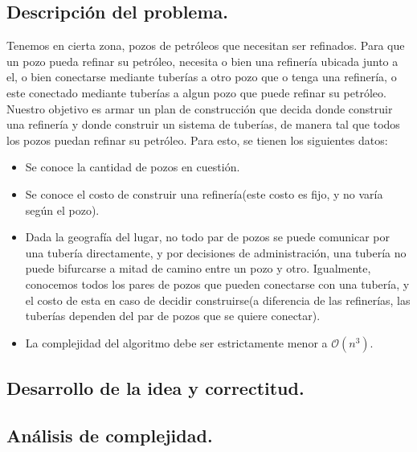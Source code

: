 \subsection{Descripción del problema.}

\vspace*{0.3cm}

Tenemos en cierta zona, pozos de petróleos que necesitan ser refinados. Para que un pozo pueda refinar su petróleo, necesita o bien una refinería ubicada junto a el, o bien conectarse mediante tuberías a otro pozo que o tenga una refinería, o este conectado mediante tuberías a algun pozo que puede refinar su petróleo. Nuestro objetivo es armar un plan de construcción que decida donde construir una refinería y donde construir un sistema de tuberías, de manera tal que todos los pozos puedan refinar su petróleo. Para esto, se tienen los siguientes datos:

\begin{itemize}

	\item Se conoce la cantidad de pozos en cuestión.
	\item Se conoce el costo de construir una refinería(este costo es fijo, y no varía según el pozo).
	\item Dada la geografía del lugar, no todo par de pozos se puede comunicar por una tubería directamente, y por decisiones de administración, una tubería no puede bifurcarse a mitad de camino entre un pozo y otro. Igualmente, conocemos todos los pares de pozos que pueden conectarse con una tubería, y el costo de esta en caso de decidir construirse(a diferencia de las refinerías, las tuberías dependen del par de pozos que se quiere conectar).
	\item La complejidad del algoritmo debe ser estrictamente menor a $\mathcal{O}(n^3)$.
	
	
\end{itemize}

\vspace*{0.6cm}

\subsection{Desarrollo de la idea y correctitud.}





\subsection{Análisis de complejidad.}

